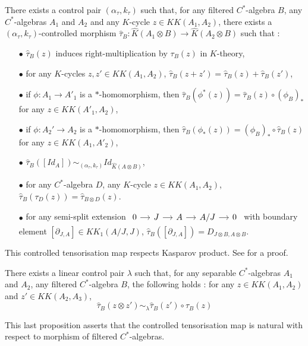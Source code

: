 \begin{thm}
There exists a control pair $(\alpha_\tau,k_\tau)$ such that, for any filtered $C^*$-algebra $B$, any $C^*$-algebras $A_1$ and $A_2$ and any $K$-cycle $z\in KK(A_1,A_2)$, there exists a $(\alpha_\tau,k_\tau)$-controlled morphism $\hat \tau_B : \hat K(A_1\otimes B)\rightarrow \hat K(A_2\otimes B)$
such that :
\begin{itemize}\label{tensorization}
\item[$\bullet$] $\hat \tau_B(z)$ induces right-multiplication by $\tau_B(z)$ in $K$-theory,
\item[$\bullet$] for any $K$-cycles $z,z'\in KK(A_1,A_2)$, $\hat \tau_B(z+z')=\hat\tau_B(z)+\hat\tau_B(z')$,
\item[$\bullet$] if $\phi : A_1\rightarrow A'_1$ is a $*$-homomorphism, then $\hat\tau_B(\phi^*(z)) =  \hat\tau_B(z)\circ (\phi_B)_*$ for any $z\in KK(A'_1,A_2)$,
\item[$\bullet$] if $\phi : A_2'\rightarrow A_2$ is a $*$-homomorphism, then $\hat\tau_B(\phi_*(z)) = (\phi_B)_*\circ \hat\tau_B(z)$ for any $z\in KK(A_1,A'_2)$,
\item[$\bullet$] $\hat \tau_B([Id_A])\sim_{(\alpha_\tau,k_\tau)} Id_{\hat K(A\otimes B)}$,
\item[$\bullet$] for any $C^*$-algebra $D$, any $K$-cycle $z\in KK(A_1,A_2)$, $\hat\tau_B (\tau_D(z))= \hat\tau_{B\otimes D}(z)$.
\item[$\bullet$] for any semi-split extension $\begin{tikzcd}[column sep = small] 0 \arrow{r}& J \arrow{r} & A \arrow{r} & A/J\arrow{r} & 0\end{tikzcd}$ with boundary element $[\partial_{J,A}]\in KK_1(A/J,J)$, $\hat\tau_B([\partial_{J,A}])=D_{J\otimes B,A\otimes B}$.
\end{itemize}
\end{thm}

This controlled tensorisation map respects Kasparov product. See \cite{OY2} for a proof.

\begin{thm}
There exists a linear control pair $\lambda$ such that, for any separable $C^*$-algebras $A_1$ and $A_2$, any filtered $C^*$-algebra $B$, the following holds : for any $z\in KK(A_1,A_2)$ and $z'\in KK(A_2,A_3)$,
\[\hat\tau_B(z\otimes z')\sim_\lambda \hat\tau_B(z')\circ\hat\tau_B(z)\]
\end{thm}

This last proposition asserts that the controlled tensorisation map is natural with respect to morphism of filtered $C^*$-algebras. \cite{OY2}


